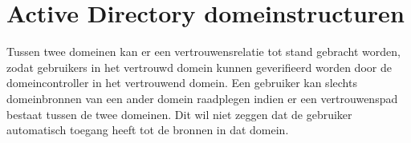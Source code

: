 	\section{Active Directory domeinstructuren }
	\begin{enumerate}
		 {
			 Tussen twee domeinen kan er een vertrouwensrelatie tot stand gebracht worden, zodat gebruikers in het vertrouwd domein kunnen geverifieerd worden door de domeincontroller in het vertrouwend domein. Een gebruiker kan slechts domeinbronnen van een ander domein raadplegen indien er een vertrouwenspad bestaat tussen de twee domeinen. Dit wil niet zeggen dat de gebruiker automatisch toegang heeft tot de bronnen in dat domein.
		
		}
		

\end{enumerate}
